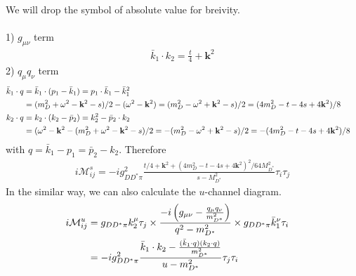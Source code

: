\documentclass[aps,prd,preprintnumbers,showpacs,showkeys,nofootinbib,
superscriptaddress,fleqn,floatfix,tightenlines, 10pt]{revtex4-1}
\begin{document}
%
We will drop the symbol of absolute value for breivity.\\\\
1) $g_{\mu\nu}$ term
\begin{align}
	\bar{k}_1 \cdot k_2 = \frac{t}{4} + \mathbf{k}^2
\end{align}
%
2) $q_\mu q_\nu$ term
\begin{align}
	\bar{k}_1 \cdot q &=  \bar{k}_1 \cdot (p_1 - \bar{k}_1) = p_1 \cdot \bar{k}_1 - \bar{k}_1^2 \cr
	&= (m_D^2 + \omega^2 - \mathbf{k}^2 - s)/2 - (\omega^2 - \mathbf{k}^2)
	= (m_D^2 - \omega^2 + \mathbf{k}^2 - s)/2 = (4m_D^2 - t - 4s + 4\mathbf{k}^2)/8 \cr
	k_2 \cdot q &= k_2 \cdot (k_2 - \bar{p}_2) = k_2^2 - \bar{p}_2 \cdot k_2 \cr
	&= (\omega^2 - \mathbf{k}^2 - (m_D^2 + \omega^2 - \mathbf{k}^2 - s)/2
	= -(m_D^2 - \omega^2 + \mathbf{k}^2 - s)/2 = -(4m_D^2 - t - 4s + 4\mathbf{k}^2)/8
\end{align}
with $q = \bar{k}_1 - p_1 = \bar{p}_2 - k_2$. Therefore
\begin{align}
	i\mathcal{M}^s_{ij} = -i g_{DD^* \pi}^2 \frac{t/4 + \mathbf{k}^2 +
	(4m_D^2 - t - 4s + 4\mathbf{k}^2)^2/64M_{D^*}^2}{s - M_{D^*}^2} \tau_i \tau_j
\end{align}
In the similar way, we can also calculate the $u$-channel diagram.
\begin{align}
	i\mathcal{M}_{ij}^u &= g_{DD^* \pi} k_2^\mu \tau_j \times \frac{-i \left(g_{\mu\nu}
	 - \frac{q_\mu q_\nu}{m_{D^*}^2}\right)}{q^2 - m_{D^*}^2} \times g_{DD^* \pi} \bar{k}_1^\nu \tau_i \cr
	 &= -i g_{DD^* \pi}^2 \frac{\bar{k}_1 \cdot k_2 - \frac{(\bar{k}_1 \cdot q)(k_2 \cdot q)}{m_{D^*}^2}}{u-m_{D^*}^2} \tau_j \tau_i
\end{align}
\end{document}
